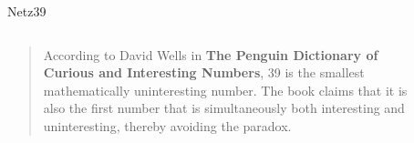 \documentclass{beamer}
\begin{document}
\begin{frame}[label=secpony]{Netz39}
    \begin{columns}
        \begin{column}{0.6\textwidth}
            \begin{quote}
                According to David Wells in \textbf{The Penguin Dictionary of Curious and Interesting Numbers}, 39 is the smallest mathematically uninteresting number. The book claims that it is also the first number that is simultaneously both interesting and uninteresting, thereby avoiding the paradox. \cite{Wikipedia2010}
            \end{quote}
        \end{column}
        \begin{column}{0.4\textwidth}
            \begin{figure}
            \end{figure}
        \end{column}
    \end{columns}
\end{frame}
\end{document}
